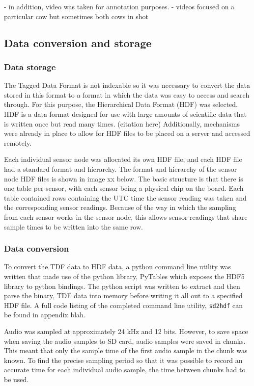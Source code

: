 - in addition, video was taken for annotation purposes.
	- videos focused on a particular cow but sometimes both cows in shot

\subsection{Data conversion and storage}

\subsubsection{Data storage}
The Tagged Data Format is not indexable so it was necessary to convert the data stored in this format to a format in which the data was easy to access and search through. For this purpose, the Hierarchical Data Format (HDF) was selected. HDF is a data format designed for use with large amounts of scientific data that is written once but read many times. (citation here) Additionally, mechanisms were already in place to allow for HDF files to be placed on a server and accessed remotely. 

Each individual sensor node was allocated its own HDF file, and each HDF file had a standard format and hierarchy. The format and hierarchy of the sensor node HDF files is shown in image xx below. The basic structure is that there is one table per sensor, with each sensor being a physical chip on the board. Each table contained rows containing the UTC time the sensor reading was taken and the corresponding sensor readings. Because of the way in which the sampling from each sensor works in the sensor node, this allows sensor readings that share sample times to be written into the same row.  


\subsubsection{Data conversion}
To convert the TDF data to HDF data, a python command line utility was written that made use of the python library, PyTables which exposes the HDF5 library to python bindings. The python script was written to extract and then parse the binary, TDF data into memory before writing it all out to a specified HDF file. A full code listing of the completed command line utility, \texttt{sd2hdf} can be found in appendix blah. 

Audio was sampled at approximately 24 kHz and 12 bits. However, to save space when saving the audio samples to SD card, audio samples were saved in chunks. This meant that only the sample time of the first audio sample in the chunk was known. To find the precise sampling period so that it was possible to record an accurate time for each individual audio sample, the time between chunks had to be used.  

